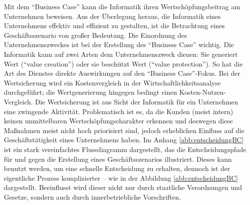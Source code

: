 Mit dem \enquote{Business Case} kann die Informatik ihren Wertschöpfungsbeitrag am Unternehmen beweisen. Aus der Überlegung heraus, die Informatik eines Unternehmens effektiv und effizient zu gestalten, ist die Betrachtung eines Geschäftsszenario von großer Bedeutung. Die Einordnung des Unternehmenszweckes ist bei der Erstellung des \enquote{Business Case} wichtig. Die Informatik kann auf zwei Arten dem Unternehmenszweck dienen: Sie generiert Wert (\enquote{value creation}) oder sie beschützt Wert (\enquote{value protection}). So hat die Art des Dienstes direkte Auswirkungen auf den \enquote{Business Case}-Fokus. Bei der Wertsicherung wird ein Kostenvergleich in der Wirtschaftlichkeitsanalyse durchgeführt; die Wertgenerierung hingegen bedingt einen Kosten-Nutzen-Vergleich. Die Wertsicherung ist aus Sicht der Informatik für ein Unternehmen eine zwingende Aktivität. Problematisch ist es, da die Kunden (meist intern) keinen unmittelbaren Wertschöpfungscharakter erkennen und deswegen diese Maßnahmen meist nicht hoch priorisiert sind, jedoch erheblichen Einfluss auf die Geschäftstätigkeit eines Unternehmens haben.\autocite[vgl.][S.\,27]{brugger_it_2009} Im Anhang \vref{abb:entscheidungBC} ist ein stark vereinfachtes Flussdiagramm dargestellt, das die Entscheidungspfade für und gegen die Erstellung eines Geschäftsszenarios illustriert. Dieses kann benutzt werden, um eine schnelle Entscheidung zu erhalten, dennoch ist der eigentliche Prozess komplizierter -- wie in der Abbildung \vref{abb:entscheidungBC} dargestellt. Beeinflusst wird dieser nicht nur durch staatliche Verordnungen und Gesetze, sondern auch durch innerbetriebliche Vorschriften. 
\par
